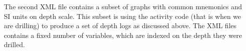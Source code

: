 {%
%
%


The second XML file contains a subset of graphs with common mnemonics and SI units on depth scale. This subset is using the activity code (that is when we are drilling) to produce a set of depth logs as discussed above. The XML files contains a fixed number of variables, which are indexed on the depth they were drilled.


}
